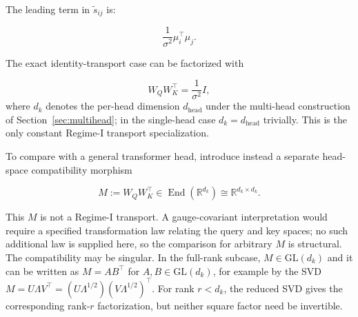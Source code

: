 \documentclass[twoside,11pt]{article}
\begin{document}
The leading term in $\tilde{s}_{ij}$ is:

\begin{equation}
\frac{1}{\sigma^2}\mu_i^\top\mu_j.
\end{equation}

The exact identity-transport case can be factorized with

\begin{equation}
W_QW_K^\top = \frac{1}{\sigma^2}I,
\end{equation}
where $d_k$ denotes the per-head dimension $d_{\text{head}}$ under the multi-head construction of Section~\ref{sec:multihead}; in the single-head case $d_k = d_{\text{head}}$ trivially. This is the only constant Regime-I transport specialization.

To compare with a general transformer head, introduce instead a separate head-space compatibility morphism

\begin{equation}
M := W_QW_K^\top \in \operatorname{End}(\mathbb{R}^{d_k}) \cong \mathbb{R}^{d_k\times d_k}.
\label{eq:structural_compatibility}
\end{equation}

This $M$ is not a Regime-I transport. A gauge-covariant interpretation would require a specified transformation law relating the query and key spaces; no such additional law is supplied here, so the comparison for arbitrary $M$ is structural. The compatibility may be singular. In the full-rank subcase, $M \in \mathrm{GL}(d_k)$ and it can be written as $M = AB^\top$ for $A, B \in \mathrm{GL}(d_k)$, for example by the SVD $M = U\Lambda V^\top = (U\Lambda^{1/2})(V\Lambda^{1/2})^\top$. For rank $r<d_k$, the reduced SVD gives the corresponding rank-$r$ factorization, but neither square factor need be invertible.
\end{document}
